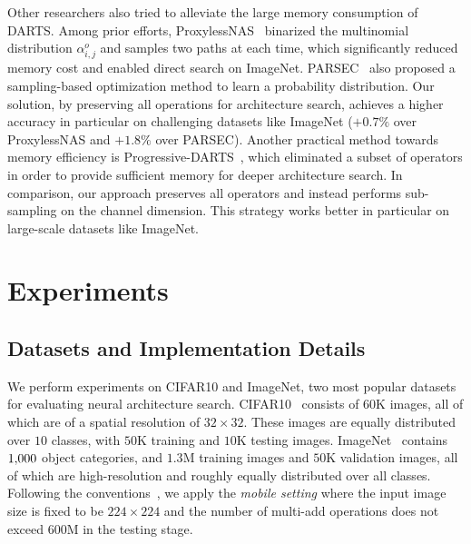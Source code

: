 \documentclass{article} \usepackage{iclr2020_conference,times}
\begin{document}
Other researchers also tried to alleviate the large memory consumption of DARTS. Among prior efforts, ProxylessNAS~\citep{cai2018proxylessnas} binarized the multinomial distribution $\alpha_{i,j}^o$ and samples two paths at each time, which significantly reduced memory cost and enabled direct search on ImageNet. PARSEC~\citep{casale2019probabilistic} also proposed a sampling-based optimization method to learn a probability distribution. Our solution, by preserving all operations for architecture search, achieves a higher accuracy in particular on challenging datasets like ImageNet ($+0.7\%$ over ProxylessNAS and $+1.8\%$ over PARSEC). Another practical method towards memory efficiency is Progressive-DARTS~\citep{chen2019progressive}, which eliminated a subset of operators in order to provide sufficient memory for deeper architecture search. In comparison, our approach preserves all operators and instead performs sub-sampling on the channel dimension. This strategy works better in particular on large-scale datasets like ImageNet.

\section{Experiments}
\label{Experiments}



\subsection{Datasets and Implementation Details}
\label{Experiments:Settings}

We perform experiments on CIFAR10 and ImageNet, two most popular datasets for evaluating neural architecture search. CIFAR10~\citep{krizhevsky2009learning} consists of $60\mathrm{K}$ images, all of which are of a spatial resolution of $32\times32$. These images are equally distributed over $10$ classes, with $50\mathrm{K}$ training and $10\mathrm{K}$ testing images. ImageNet~\citep{deng2009imagenet} contains $1\rm{,}000$ object categories, and $1.3\mathrm{M}$ training images and $50\mathrm{K}$ validation images, all of which are high-resolution and roughly equally distributed over all classes. Following the conventions~\citep{zoph2018learning,liu2018darts}, we apply the \textit{mobile setting} where the input image size is fixed to be $224\times224$ and the number of multi-add operations does not exceed $600\mathrm{M}$ in the testing stage.
\end{document}
